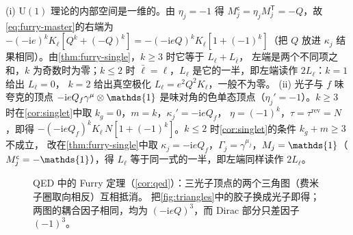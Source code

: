 \documentclass[UTF8,a4paper,11pt,fontset=fandol]{ctexart}
\makeatletter
\let\amsmathbb\mathbb
\renewcommand{\mathbb}[1]{\ifx1#1\mathds{1}\else\amsmathbb{#1}\fi}
\theoremstyle{cplain}
\theoremstyle{cdefinition}
\theoremstyle{cremark}
\renewcommand{\proofname}{证明}
\renewenvironment{proof}[1][\proofname]{\par\pushQED{\qed}\normalfont\topsep6\p@\@plus6\p@\relax
  \trivlist\item[\hskip\labelsep\itshape #1\hspace{0.5em}]\ignorespaces}{\popQED\endtrivlist\@endpefalse}
\numberwithin{equation}{section}
\newcommand{\tp}{\mathsf{T}}                         %
\newcommand{\ii}{\mathrm{i}}                        %
\makeatother
\begin{document}
\begin{proof}
(i) $\mathrm U(1)$ 理论的内部空间是一维的。由 $\eta_j=-1$ 得 $M_j^{\mathsf c}=\eta_jM_j^{\tp}=-Q$，故\cref{eq:furry-master}的右端为
$-(-\ii e)^kK_\ell[Q^k+(-Q)^k]=-(-\ii eQ)^kK_\ell[1+(-1)^k]$（把 $Q$ 放进 $\kappa_j$ 结果相同）。由\cref{thm:furry-single}，$k\ge3$ 时它等于 $L_\ell+L_{\bar\ell}$，
左端是两个不同项之和，$k$ 为奇数时为零；$k\le2$ 时 $\bar\ell=\ell$，$L_\ell$ 是它的一半，即左端读作 $2L_\ell$：$k=1$ 给出 $L_\ell=0$，
$k=2$ 给出真空极化 $L_\ell=e^2Q^2K_\ell$，一般不为零。
(ii) 光子与 $f$ 味夸克的顶点 $-\ii eQ_f\gamma^\mu\otimes\mathbb 1$ 是味对角的色单态顶点（$\eta_j'=-1$）。$k\ge3$ 时在\cref{cor:singlet}中取 $k_g=0$，$m=k$，$\kappa_j'=-\ii eQ_f$，
$\eta=(-1)^k$，$\tau=\tau^{\mathrm{rev}}=N$，即得 $-(-\ii eQ_f)^kK_\ell\,N[1+(-1)^k]$。$k\le2$ 时\cref{cor:singlet}的条件 $k_g+m\ge3$ 不成立，
改在\cref{thm:furry-single}中取 $\kappa_j=-\ii eQ_f$，$\Gamma_j=\gamma^{\mu_j}$，$M_j=\mathbb 1$（$M_j^{\mathsf c}=-\mathbb 1$），得 $L_\ell$ 等于同一式的一半，即左端同样读作 $2L_\ell$。
\end{proof}

\begin{figure}[htbp]
\centering
{}
\caption{QED 中的 Furry 定理（\cref{cor:qed}）：三光子顶点的两个三角图（费米子圈取向相反）互相抵消。
把\cref{fig:triangles}中的胶子换成光子即得；两图的耦合因子相同，均为 $(-\ii eQ)^3$，而 Dirac 部分只差因子 $(-1)^3$。}
\label{fig:qed-triangles}
\end{figure}
\end{document}
